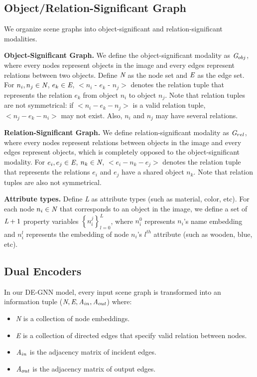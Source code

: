\documentclass[letterpaper]{article} %
\begin{document}
\subsection{Object/Relation-Significant Graph}
We organize scene graphs into object-significant and relation-significant modalities. 

\medskip
\textbf{Object-Significant Graph.} We define the object-significant modality as $\emph{G}_{obj}$, where every nodes represent objects in the image and every edges represent relations between two objects. Define $\emph{N}$ as the node set and $\emph{E}$ as the edge set. For $n_i, n_j \in \emph{N}$, $e_k \in \emph{E}$, $<n_i$ - $e_k$ - $n_j>$ denotes the relation tuple that represents the relation $e_k$ from object $n_i$ to object $n_j$. Note that relation tuples are not symmetrical: if $<n_i - e_k - n_j>$ is a valid relation tuple,  $<n_j - e_k - n_i>$ may not exist. Also, $n_i$ and $n_j$ may have several relations. 

\medskip
\textbf{Relation-Significant Graph.} We define relation-significant modality as $\emph{G}_{rel}$, where every nodes represent relations between objects in the image and every edges represent objects, which is completely opposed to the object-significant modality. For $e_i, e_j \in \emph{E}$, $n_k \in \emph{N}$, $<e_i - n_k - e_j>$ denotes the relation tuple that represents the relations $e_i$ and $e_j$ have a shared object $n_k$. Note that relation tuples are also not symmetrical.

\medskip
\textbf{Attribute types.} Define \emph{L} as attribute types (such as material, color, etc). 
For each node $n_i\in\emph{N}$ that corresponds to an object in the image, we define a set of $\emph{L}+1$ property variables ${\left\{ n_i^j\right\}}_{l=0}^L$, where $n_i^{0}$ represents $n_i$'s name embedding and $n_i^l$ represents the embedding of node $n_i$'s $l^{th}$ attribute (such as wooden, blue, etc).

\subsection{Dual Encoders}

In our DE-GNN model, every input scene graph is transformed into an information tuple ($\emph{N}, \emph{E}, \emph{A}_{in}, \emph{A}_{out}$) where:
\begin{itemize}
    \item \emph{N} is a collection of node embeddings.
    \item \emph{E} is a collection of directed edges that specify valid relation between nodes.
    \item $\emph{A}_{in}$ is the adjacency matrix of incident edges.
    \item $\emph{A}_{out}$ is the adjacency matrix of output edges.
\end{itemize}
\end{document}
